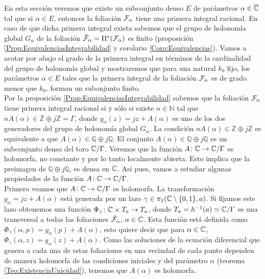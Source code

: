En esta sección veremos que existe un subconjunto denso $E$ de parámetros $\alpha\in\overline{\mathbb{C}}$ tal que si $\alpha\in E$, entonces la foliación $\mathcal{F}_{\alpha}$ tiene una primera integral racional. En caso de que dicha primera integral exista sabemos que el grupo de holonomía global $G_{\alpha}$ de la foliación $\tilde{\mathcal{F}}_{\alpha}=\Pi^{*}(\mathcal{F}_{\alpha})$ es finito (proposición \ref{Prop:EquivalenciasIntegrabilidad} y corolario \ref{Coro:Equivalencias}). Vamos a acotar por abajo el grado de la primera integral en términos de la cardinalidad del grupo de holonomía global y mostraremos que para una natural $k_{0}$ fijo, los parámetros $\alpha\in E$ tales que la primera integral de la foliación $\mathcal{F}_{\alpha}$ es de grado menor que $k_{0}$, forman un subonjunto finito.\\

Por la proposición \ref{Prop:EquivalenciasIntegrabilidad} sabemos que la foliación $\mathcal{F}_{\alpha}$ tiene primera integral racional si y sólo si existe $n\in\mathbb{N}$ tal que $nA(\alpha)\in\mathbb{Z}\oplus j\mathbb{Z}=\Gamma$, donde $g_{\alpha}(z)=jz+A(\alpha)$ es uno de los dos generadores del grupo de holonomía global $G_{\alpha}$. La condición $nA(\alpha)\in\mathbb{Z}\oplus j\mathbb{Z}$ es equivalente a que $A(\alpha)\in\mathbb{Q}\oplus j\mathbb{Q}$. El conjunto $A(\alpha)\in\mathbb{Q}\oplus j\mathbb{Q}$ es un subconjunto denso del toro $\mathbb{C}/\Gamma$. Veremos que la función $A\colon\mathbb{C}\rightarrow\mathbb{C}/\Gamma$ es holomorfa, no constante y por lo tanto localmente abierta. Esto implica que la preimagen de $\mathbb{Q}\oplus j\mathbb{Q}$, es densa en $\mathbb{C}$. Así pues, vamos a estudiar algunas propiedades de la función $A\colon\mathbb{C}\rightarrow \mathbb{C}/\Gamma$.\\

Primero veamos que $A\colon\mathbb{C}\rightarrow\mathbb{C}/\Gamma$ es holomorfa. La transformación $g_{\alpha}=jz+A(\alpha)$ está generada por un lazo $\gamma\in\pi_{1}(\mathbb{C}\setminus\{0,1\},a)$. Si fijamos este lazo obtenemos una función $\Phi_{\gamma}\colon\mathbb{C}\times T_{a}\rightarrow T_{a}$, donde $T_{a}=h^{-1}(a)\simeq\mathbb{C}/\Gamma$ es una transversal a todas las foliaciones $\tilde{\mathcal{F}}_{\alpha},\, \alpha\in\mathbb{C}$. Esta función está definida como $\Phi_{\gamma}(\alpha,p)=g_{\alpha}(p)+A(\alpha)$, esto quiere decir que para $\alpha\in\mathbb{C}$, $\Phi_{\gamma}(\alpha,z)=g_{\alpha}(z)+A(\alpha)$. Como las soluciones de la ecuación diferencial que genera a cada una de estas foliaciones en una vecindad de cada punto dependen de manera holomorfa de las condiciones iniciales y del parámetro $\alpha$ (teorema \ref{Teo:ExistenciaUnicidad}), tenemos que $A(\alpha)$ es holomorfa.\\

